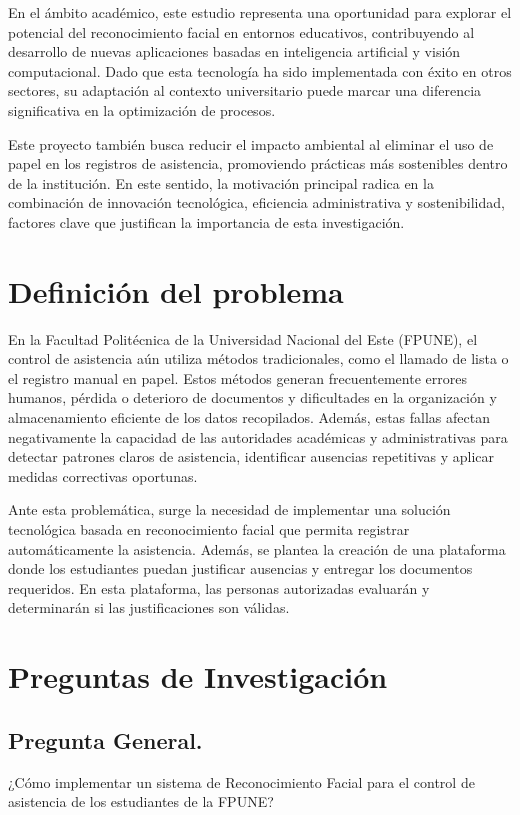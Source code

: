En el ámbito académico, este estudio representa una oportunidad para explorar el potencial del reconocimiento facial en entornos educativos, contribuyendo al desarrollo de nuevas aplicaciones basadas en inteligencia artificial y visión computacional. Dado que esta tecnología ha sido implementada con éxito en otros sectores, su adaptación al contexto universitario puede marcar una diferencia significativa en la optimización de procesos.

Este proyecto también busca reducir el impacto ambiental al eliminar el uso de papel en los registros de asistencia, promoviendo prácticas más sostenibles dentro de la institución. En este sentido, la motivación principal radica en la combinación de innovación tecnológica, eficiencia administrativa y sostenibilidad, factores clave que justifican la importancia de esta investigación.
\section{Definición del problema}
En la Facultad Politécnica de la Universidad Nacional del Este (FPUNE), el control de asistencia aún utiliza métodos tradicionales, como el llamado de lista o el registro manual en papel. Estos métodos generan frecuentemente errores humanos, pérdida o deterioro de documentos y dificultades en la organización y almacenamiento eficiente de los datos recopilados. Además, estas fallas afectan negativamente la capacidad de las autoridades académicas y administrativas para detectar patrones claros de asistencia, identificar ausencias repetitivas y aplicar medidas correctivas oportunas.

Ante esta problemática, surge la necesidad de implementar una solución tecnológica basada en reconocimiento facial que permita registrar automáticamente la asistencia. Además, se plantea la creación de una plataforma donde los estudiantes puedan justificar ausencias y entregar los documentos requeridos. En esta plataforma, las personas autorizadas evaluarán y determinarán si las justificaciones son válidas.
\section{Preguntas de Investigación}
\subsection{Pregunta General.}
¿Cómo implementar un sistema de Reconocimiento Facial para el control de asistencia de los estudiantes de la FPUNE?

